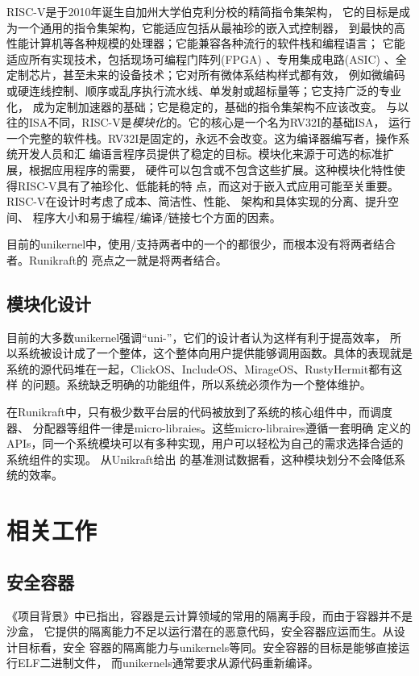 \documentclass{../runikraft-report}
\begin{document}
RISC-V是于2010年诞生自加州大学伯克利分校的精简指令集架构，
它的目标是成为一个通用的指令集架构，它能适应包括从最袖珍的嵌入式控制器，
到最快的高性能计算机等各种规模的处理器；它能兼容各种流行的软件栈和编程语言；
它能适应所有实现技术，包括现场可编程门阵列(FPGA)
 、专用集成电路(ASIC) 、全定制芯片，甚至未来的设备技术；它对所有微体系结构样式都有效，
例如微编码或硬连线控制、顺序或乱序执行流水线、单发射或超标量等；它支持广泛的专业化，
成为定制加速器的基础；它是稳定的，基础的指令集架构不应该改变。\cite{bib:risc-v-manual}
与以往的ISA不同，RISC-V是\textit{模块化}的。它的核心是一个名为RV32I的基础ISA，
运行一个完整的软件栈。RV32I是固定的，永远不会改变。这为编译器编写者，操作系统开发人员和汇
编语言程序员提供了稳定的目标。模块化来源于可选的标准扩展，根据应用程序的需要，
硬件可以包含或不包含这些扩展。这种模块化特性使得RISC-V具有了袖珍化、低能耗的特
点，而这对于嵌入式应用可能至关重要。RISC-V在设计时考虑了成本、简洁性、性能、
架构和具体实现的分离、提升空间、
程序大小和易于编程/编译/链接七个方面的因素。

目前的unikernel中，使用/支持两者中的一个的都很少，而根本没有将两者结合者。Runi\-kraft的
亮点之一就是将两者结合。

\subsection{模块化设计}
目前的大多数unikernel强调“uni-”，它们的设计者认为这样有利于提高效率，
所以系统被设计成了一个整体，这个整体向用户提供能够调用函数。具体的表现就是
系统的源代码堆在一起，ClickOS、IncludeOS、MirageOS、RustyHermit都有这样
的问题。系统缺乏明确的功能组件，所以系统必须作为一个整体维护。

在Runikraft中，只有极少数平台层的代码被放到了系统的核心组件中，而调度器、
分配器等组件一律是micro-libraies。这些micro-libraires遵循一套明确
定义的APIs，同一个系统模块可以有多种实现，用户可以轻松为自己的需求选择合适的系统组件的实现。
从Unikraft给出
的基准测试数据看，这种模块划分不会降低系统的效率。

\section{相关工作}

\subsection{安全容器}
《项目背景》中已指出，容器是云计算领域的常用的隔离手段，而由于容器并不是沙盒，
它提供的隔离能力不足以运行潜在的恶意代码，安全容器应运而生。从设计目标看，安全
容器的隔离能力与unikernels等同。安全容器的目标是能够直接运行ELF二进制文件，
而unikernels通常要求从源代码重新编译。
\end{document}
